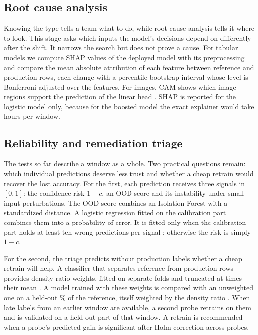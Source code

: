 \documentclass[10pt]{article}
\begin{document}
\subsection{Root cause analysis}
Knowing the type tells a team what to do, while root cause analysis tells it where to look. This stage asks which inputs the model's decisions depend on differently after the shift. It narrows the search but does not prove a cause. For tabular models we compute SHAP values \cite{lundberg2017unified} of the deployed model with its preprocessing and compare the mean absolute attribution of each feature between reference and production rows, each change with a percentile bootstrap interval whose level is Bonferroni adjusted over the features. For images, CAM shows which image regions support the prediction of the linear head \cite{zhou2016cam}. SHAP is reported for the logistic model only, because for the boosted model the exact explainer would take hours per window.

\subsection{Reliability and remediation triage}
The tests so far describe a window as a whole. Two practical questions remain: which individual predictions deserve less trust and whether a cheap retrain would recover the lost accuracy. For the first, each prediction receives three signals in $[0,1]$: the confidence risk $1-c$, an OOD score and its instability under small input perturbations. The OOD score combines an Isolation Forest \cite{liu2008isolation} with a standardized distance. A logistic regression fitted on the calibration part combines them into a probability of error. It is fitted only when the calibration part holds at least ten wrong predictions per signal \cite{peduzzi1996}; otherwise the risk is simply $1-c$.

For the second, the triage predicts without production labels whether a cheap retrain will help. A classifier that separates reference from production rows provides density ratio weights, fitted on separate folds and truncated at  times their mean \cite{cortes2010weights}. A model trained with these weights is compared with an unweighted one on a held-out \% of the reference, itself weighted by the density ratio \cite{shimodaira2000,sugiyama2007}. When late labels from an earlier window are available, a second probe retrains on them and is validated on a held-out part of that window. A retrain is recommended when a probe's predicted gain is significant after Holm correction across probes.
\end{document}
